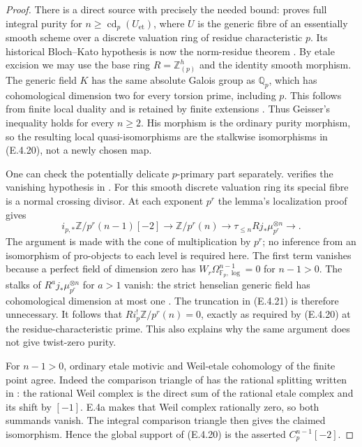 \begin{proof}
There is a direct source with precisely the needed bound:
\citet[Proposition 5.1, p.~789]{D_GeisserDedekind2004}
proves full integral purity for $n\ge\operatorname{cd}_p(U_{\mathrm{et}})$,
where $U$ is the generic fibre of an essentially smooth scheme over
a discrete valuation ring of residue characteristic $p$.
Its historical Bloch--Kato hypothesis is now the norm-residue
theorem \citep[Theorems 6.16--6.17, pp.~436--437]{D_Voevodsky2011}.
By etale excision we may use the base ring
$R=\mathbb Z_{(p)}^h$ and the identity smooth morphism.
The generic field $K$ has the same absolute Galois group as
$\mathbb Q_p$, which has cohomological dimension two for every
torsion prime, including $p$. This follows from finite local
duality and is retained by finite extensions
\citep[I, Theorems 2.1 and 2.14]{D_MilneADT2006}.
Thus Geisser's inequality holds for every $n\ge2$.
His morphism is the ordinary purity morphism, so the resulting
local quasi-isomorphisms are the stalkwise isomorphisms in
(E.4.20), not a newly chosen map.

One can check the potentially delicate $p$-primary part separately.
\citet[Corollary 4.4, p.~786]{D_GeisserDedekind2004}
verifies the vanishing hypothesis in
\citet[Lemma 7.7, pp.~1543--1545]{D_FlachMorin2018}.
For this smooth discrete valuation ring its special fibre is a
normal crossing divisor. At each exponent $p^r$ the lemma's
localization proof gives
\[
 i_{p,*}\mathbb Z/p^r(n-1)[-2]\longrightarrow
 \mathbb Z/p^r(n)\longrightarrow
 \tau_{\le n}Rj_*\mu_{p^r}^{\otimes n}\longrightarrow.
 \tag{E.4.21}
\]
The argument is made with the cone of multiplication by $p^r$;
no inference from an isomorphism of pro-objects to each level
is required here. The first term vanishes because a perfect
field of dimension zero has
$W_r\Omega_{\mathbb F_p,\log}^{n-1}=0$ for $n-1>0$.
The stalks of $R^a j_*\mu_{p^r}^{\otimes n}$ for $a>1$
vanish: the strict henselian generic field has cohomological
dimension at most one
\citep[II, Lemma 1.3 and its proof, p.~150]{D_MilneADT2006}.
The truncation in (E.4.21) is therefore unnecessary.
It follows that $Ri_p^!\mathbb Z/p^r(n)=0$, exactly as
required by (E.4.20) at the residue-characteristic prime.
This also explains why the same argument does not give
twist-zero purity.

For $n-1>0$, ordinary etale motivic and Weil-etale cohomology
of the finite point agree. Indeed the comparison triangle of
\citet[Theorem 7.1]{D_Geisser2004} has the rational splitting
written in \citet[Proposition 3.17, equation (41), p.~1459]{D_FlachMorin2018}:
the rational Weil complex is the direct sum of the rational
etale complex and its shift by $[-1]$. E.4a makes that Weil
complex rationally zero, so both summands vanish. The integral
comparison triangle then gives the claimed isomorphism.
Hence the global support of (E.4.20) is the asserted
$C_p^{n-1}[-2]$.
\end{proof}

